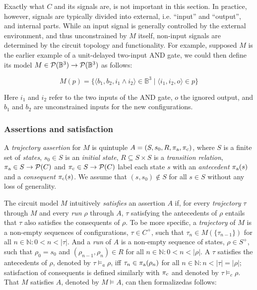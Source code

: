 
Exactly what $C$ and its signals are, is not important in this section. In practice, however, signals are typically divided into external, i.e. ``input'' and ``output'', and internal parts. While an input signal is generally controlled by the external environment, and thus unconstrained by $M$ itself, non-input signals are determined by the circuit topology and functionality. For example, supposed $M$ is the earlier example of a unit-delayed two-input AND gate, we could then define its model $M \in \mathcal{P}(\mathbb{B}^{3}) \rightarrow \mathcal{P}(\mathbb{B}^{3})$ as follows:


\begin{equation*}
M(p) = \{ \langle b_{1}, b_{2}, i_{1} \wedge i_{2} \rangle \in \mathbb{B}^{3} \mid \langle i_{1}, i_{2}, o \rangle \in p \}
\end{equation*}

\noindent Here $i_{1}$ and $i_{2}$ refer to the two inputs of the AND gate, $o$ the ignored output, and $b_{1}$ and $b_{2}$ are unconstrained inputs for the new configurations.

\subsubsection{Assertions and satisfaction} \label{sec:set-sat}

A \textit{trajectory assertion} for $M$ is quintuple $A = (S,s_{0},R,\operatorname{\pi_{\textrm{a}}},\operatorname{\pi_{\textrm{c}}})$, where $S$ is a finite set of \textit{states}, $s_{0} \in S$ is an \textit{initial state}, $R \subseteq S \times S$ is a \textit{transition relation}, $\operatorname{\pi_{\textrm{a}}} \in S \rightarrow \mathcal{P}(C)$ and $\operatorname{\pi_{\textrm{c}}} \in S \rightarrow \mathcal{P}(C)$ label each state $s$ with an \textit{antecedent} $\operatorname{\pi_{\textrm{a}}}(s)$ and a \textit{consequent} $\operatorname{\pi_{\textrm{c}}}(s)$. We assume that $(s,s_{0}) \notin S$ for all $s \in S$ without any loss of generality.

The circuit model $M$ intuitively \textit{satisfies} an assertion $A$ if, for every \textit{trajectory} $\tau$ through $M$ and every \textit{run} $\rho$ through $A$, $\tau$ satisfying the antecedents of $\rho$ entails that $\tau$ also satisfies the consequents of $\rho$. To be more specific, a \textit{trajectory} of $M$ is a non-empty sequences of configurations, $\tau \in C^{+}$, such that $\tau_{n} \in M(\{ \tau_{n-1} \})$ for all $n \in \mathbb{N} : 0 < n < | \tau |$. And a \textit{run} of $A$ is a non-empty sequence of states, $\rho \in S^{+}$, such that $\rho_{0} = s_{0}$ and $(\rho_{n-1}, \rho_{n}) \in R$ for all $n \in \mathbb{N} : 0 < n < | \rho |$. A $\tau$ satisfies the antecedents of $\rho$, denoted by $\tau \models_{a} \rho$, iff $\tau_{n} \in \operatorname{\pi_{\textrm{a}}}(\rho_{n})$ for all $n \in \mathbb{N} : n < | \tau | = | \rho |$; satisfaction of consequents is defined similarly with $\operatorname{\pi_{\textrm{c}}}$ and denoted by $\tau \models_{c} \rho$. That $M$ satisfies $A$, denoted by $M \models A$, can then formalized\footnotemark as follows:

